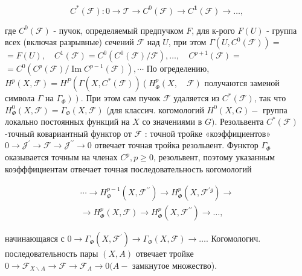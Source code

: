 \documentclass[10pt]{article}
\begin{document}
\[

C^{*}(\mathscr{F}): 0 \longrightarrow \mathscr{\mathscr { T }} \longrightarrow C^{0}(\mathscr{F}) \longrightarrow C^{\mathbf{1}}(\mathscr{F}) \longrightarrow \ldots,

\]



где $C^{0}(\mathscr{F})$ - пучок, определяемый предпучком $F$, для к-рого $F(U)$ - группа всех (включая разрывные) сечений $\mathscr{F}$ над $U$, при этом $\Gamma\left(U, C^{0}(\mathcal{F})\right)=$ $=F(U), \quad C^{1}(\mathscr{F})=C^{0}\left(C^{0}(\mathscr{F}) / \mathscr{F}\right), \ldots, \quad C^{p+1}(\mathscr{F})=$ $=C^{0}\left(C^{p}(\mathscr{F}) / \operatorname{Im} C^{p-1}(\mathscr{F})\right), \cdots$ По огределению, $H^{p}(X, \mathscr{F})=H^{P}\left(\Gamma\left(X, C^{*}(\mathscr{F})\right)\left(H_{\Phi}^{p}(X, \quad \mathscr{F})\right.\right.$ получаются заменой символа $\Gamma$ на $\left.\left.\Gamma_{\Phi}\right)\right)$. При этом сам пучок $\mathscr{F}$ удаляется из $C^{*}(\mathscr{F})$, так что $H_{\Phi}^{0}(X, \mathscr{F})=\Gamma_{\Phi}(X, \mathscr{F})$ (для классич. когомологий $H^{0}(X, G)-$ группа локально постоянных функций на $X$ со значениями в $G)$. Резольвента $C^{*}(\mathscr{F})$-точный ковариантный функтор от $\mathscr{F}$ : точной тройке «коэффициентов» $0 \rightarrow \mathscr{J}^{\prime} \rightarrow \mathscr{F} \rightarrow \mathscr{J}^{\prime \prime} \rightarrow 0$ отвечает точная тройка резольвент. Функтор $\Gamma_{\Phi}$ оказывается точным на членах $C^{p}, p \geqslant 0$, резольвент, поэтому указанным коэфффициентам отвечает точная последовательность когомологий



\[

\begin{gathered}

\cdots \longrightarrow H_{\Phi}^{p-1}\left(X, \mathscr{F}^{\prime \prime}\right) \rightarrow H_{\Phi}^{p}\left(X, \mathscr{F}^{\prime g}\right) \rightarrow \\

\longrightarrow H_{\Phi}^{p}(X, \mathscr{F}) \rightarrow H_{\Phi}^{p}\left(X, \mathscr{F}^{\prime \prime}\right) \longrightarrow \ldots,

\end{gathered}

\]



начинающаяся с $0 \rightarrow \Gamma_{\Phi}\left(X, \mathscr{F}^{\prime}\right) \rightarrow \Gamma_{\Phi}(X, \mathscr{F}) \rightarrow \ldots$. Когомологич. последовательность пары $(X, A)$ отвечает тройке $0 \rightarrow \mathscr{F}_{X \backslash A} \rightarrow \mathscr{F} \rightarrow \mathscr{F}_{A} \rightarrow 0(A-$ замкнутое множество).
\end{document}
